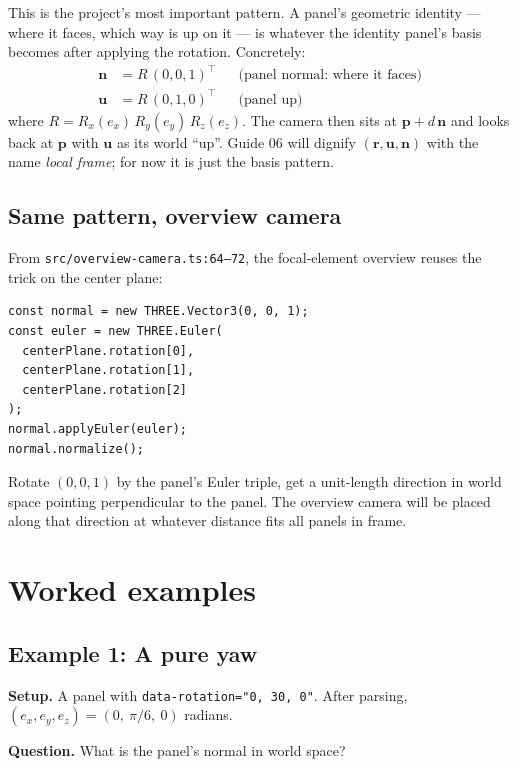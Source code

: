 \documentclass{article}
\begin{document}
\noindent This is the project's most important pattern. A panel's geometric
identity --- where it faces, which way is up on it --- is whatever the
identity panel's basis becomes after applying the rotation. Concretely:
\begin{align*}
\mathbf{n} &= R\,(0,0,1)^\top &&\text{(panel normal: where it faces)}\\
\mathbf{u} &= R\,(0,1,0)^\top &&\text{(panel up)}
\end{align*}
where $R = R_x(e_x)\,R_y(e_y)\,R_z(e_z)$. The camera then sits at
$\mathbf{p} + d\,\mathbf{n}$ and looks back at $\mathbf{p}$ with $\mathbf{u}$ as
its world ``up''. Guide 06 will dignify $(\mathbf{r}, \mathbf{u}, \mathbf{n})$
with the name \emph{local frame}; for now it is just the basis pattern.

\subsection{Same pattern, overview camera}

From \texttt{src/overview-camera.ts:64--72}, the focal-element overview reuses
the trick on the center plane:

\begin{lstlisting}[caption={overview-camera.ts: calculateFocalElementMode (excerpt)}]
const normal = new THREE.Vector3(0, 0, 1);
const euler = new THREE.Euler(
  centerPlane.rotation[0],
  centerPlane.rotation[1],
  centerPlane.rotation[2]
);
normal.applyEuler(euler);
normal.normalize();
\end{lstlisting}

\noindent Rotate $(0,0,1)$ by the panel's Euler triple, get a unit-length
direction in world space pointing perpendicular to the panel. The overview
camera will be placed along that direction at whatever distance fits all
panels in frame.

\section{Worked examples}

\subsection*{Example 1: A pure yaw}

\textbf{Setup.} A panel with \lstinline|data-rotation="0, 30, 0"|. After
parsing, $(e_x, e_y, e_z) = (0,\ \pi/6,\ 0)$ radians.

\textbf{Question.} What is the panel's normal in world space?
\end{document}
